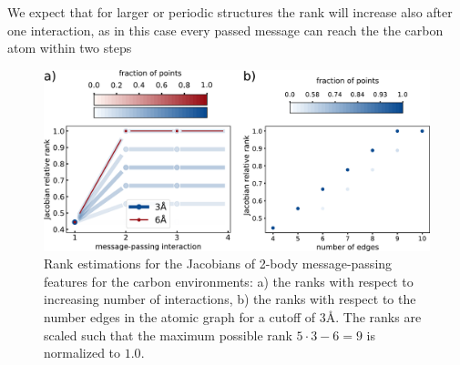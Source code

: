 We expect that for larger or periodic structures the rank will increase also after one interaction, as in this case every passed message can reach the the carbon atom within two steps
\begin{figure}[h]
    \centering
    \includegraphics[width=\textwidth]{fig/ranks_CH-train-max_est-checkpoint0.pdf}
    \caption{Rank estimations for the Jacobians of 2-body message-passing features for the carbon environments: a) the ranks with respect to increasing number of interactions, b) the ranks with respect to the number edges in the atomic graph for a cutoff of $3$\AA. The ranks are scaled such that the maximum possible rank $5\cdot3-6=9$ is normalized to $1.0$.}
    \label{fig:message-passing-results}
\end{figure}


